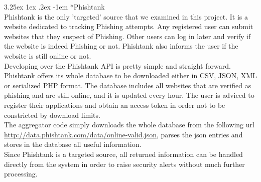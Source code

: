 \documentclass[12pt]{article}
\makeatletter
\renewcommand\paragraph{\@startsection{paragraph}{5}{\z@}%
  {3.25ex \@plus1ex \@minus.2ex}%
  {-1em}%
  {\normalfont\normalsize\bfseries}}
\makeatother
\begin{document}
\paragraph*{Phishtank}
\hfill \break\\
Phishtank is the only 'targeted' source that we examined in this project. It is a website dedicated to tracking Phishing attempts. Any registered user can submit websites that they suspect of Phishing. Other users can log in later and verify if the website is indeed Phishing or not. Phishtank also informs the user if the website is still online or not.
\hfill \break\\
Developing over the Phishtank API is pretty simple and straight forward. Phishtank offers its whole database to be downloaded either in CSV, JSON, XML or serialized PHP format. The database includes all websites that are verified as phishing and are still online, and it is updated every hour. The user is adviced to register their applications and obtain an access token in order not to be constricted by download limits.
\hfill \break\\
The aggregator code simply downloads the whole database from the following url \url{http://data.phishtank.com/data/online-valid.json}, parses the json entries and stores in the database all useful information. 
\hfill \break\\
Since Phishtank is a targeted source, all returned information can be handled directly from the system in order to raise security alerts without much further processing. 
 
\end{document}
